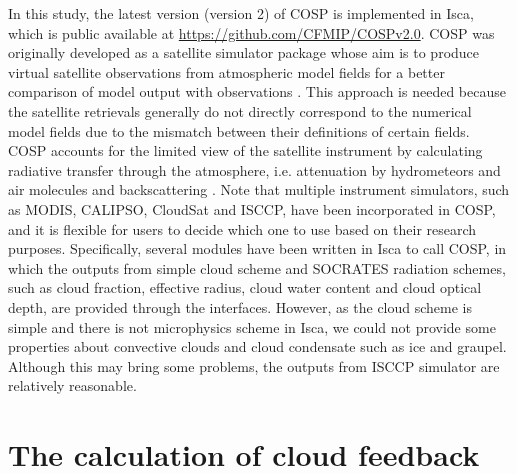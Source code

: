 In this study, the latest version (version 2) of COSP \citep{Swales2018} is implemented in Isca, which is public available at \url{https://github.com/CFMIP/COSPv2.0}. COSP was originally developed as a satellite simulator package whose aim is to produce virtual satellite observations from atmospheric model fields for a better comparison of model output with observations \citep{BodasSalcedo2011}. This approach is needed because the satellite retrievals generally do not directly correspond to the numerical model fields due to the mismatch between their definitions of certain fields. COSP accounts for the limited view of the satellite instrument by calculating radiative transfer through the atmosphere, i.e. attenuation by hydrometeors and air molecules and backscattering \citep{Kuma2020}. Note that multiple instrument simulators, such as MODIS, CALIPSO, CloudSat and ISCCP, have been incorporated in COSP, and it is flexible for users to decide which one to use based on their research purposes. Specifically, several modules have been written in Isca to call COSP, in which the outputs from simple cloud scheme and SOCRATES radiation schemes, such as cloud fraction, effective radius, cloud water content and cloud optical depth, are provided through the interfaces. However, as the cloud scheme is simple and there is not microphysics scheme in Isca, we could not provide some properties about convective clouds and cloud condensate such as ice and graupel. Although this may bring some problems, the outputs from ISCCP simulator are relatively reasonable.

\section{The calculation of cloud feedback}
\label{sec:method_cloud_fbk}


